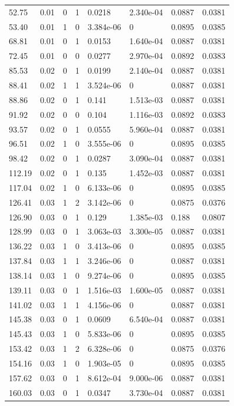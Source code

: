 \documentclass[preview]{standalone}
\begin{document}
{{\begin{tabular}{L{1.2cm}C{1.2cm} C{0.3cm}C{0.5cm} C{1.4cm}C{1.4cm} C{1.4cm}C{1.4cm}}
  52.75  &  0.01  & 0     &  1 &  0.0218  & 2.340e-04  & 0.0887 &  0.0381   \\ 
  53.40  &  0.01  & 1     &  0 &  3.384e-06  & 0  & 0.0895 &  0.0385   \\ 
  68.81  &  0.01  & 0     &  1 &  0.0153  & 1.640e-04  & 0.0887 &  0.0381   \\ 
  72.45  &  0.01  & 0     &  0 &  0.0277  & 2.970e-04  & 0.0892 &  0.0383   \\ 
  85.53  &  0.02  & 0     &  1 &  0.0199  & 2.140e-04  & 0.0887 &  0.0381   \\ 
  88.41  &  0.02  & 1     &  1 &  3.524e-06  & 0  & 0.0887 &  0.0381   \\ 
  88.86  &  0.02  & 0     &  1 &  0.141  & 1.513e-03  & 0.0887 &  0.0381   \\ 
  91.92  &  0.02  & 0     &  0 &  0.104  & 1.116e-03  & 0.0892 &  0.0383   \\ 
  93.57  &  0.02  & 0     &  1 &  0.0555  & 5.960e-04  & 0.0887 &  0.0381   \\ 
  96.51  &  0.02  & 1     &  0 &  3.555e-06  & 0  & 0.0895 &  0.0385   \\ 
  98.42  &  0.02  & 0     &  1 &  0.0287  & 3.090e-04  & 0.0887 &  0.0381   \\ 
  112.19  &  0.02  & 0     &  1 &  0.135  & 1.452e-03  & 0.0887 &  0.0381   \\ 
  117.04  &  0.02  & 1     &  0 &  6.133e-06  & 0  & 0.0895 &  0.0385   \\ 
  126.41  &  0.03  & 1     &  2 &  3.142e-06  & 0  & 0.0875 &  0.0376   \\ 
  126.90  &  0.03  & 0     &  1 &  0.129  & 1.385e-03  & 0.188 &  0.0807   \\ 
  128.99  &  0.03  & 0     &  1 &  3.063e-03  & 3.300e-05  & 0.0887 &  0.0381   \\ 
  136.22  &  0.03  & 1     &  0 &  3.413e-06  & 0  & 0.0895 &  0.0385   \\ 
  137.84  &  0.03  & 1     &  1 &  3.246e-06  & 0  & 0.0887 &  0.0381   \\ 
  138.14  &  0.03  & 1     &  0 &  9.274e-06  & 0  & 0.0895 &  0.0385   \\ 
  139.11  &  0.03  & 0     &  1 &  1.516e-03  & 1.600e-05  & 0.0887 &  0.0381   \\ 
  141.02  &  0.03  & 1     &  1 &  4.156e-06  & 0  & 0.0887 &  0.0381   \\ 
  145.38  &  0.03  & 0     &  1 &  0.0609  & 6.540e-04  & 0.0887 &  0.0381   \\ 
  145.43  &  0.03  & 1     &  0 &  5.833e-06  & 0  & 0.0895 &  0.0385   \\ 
  153.42  &  0.03  & 1     &  2 &  6.328e-06  & 0  & 0.0875 &  0.0376   \\ 
  154.16  &  0.03  & 1     &  0 &  1.903e-05  & 0  & 0.0895 &  0.0385   \\ 
  157.62  &  0.03  & 0     &  1 &  8.612e-04  & 9.000e-06  & 0.0887 &  0.0381   \\ 
  160.03  &  0.03  & 0     &  1 &  0.0347  & 3.730e-04  & 0.0887 &  0.0381   \\ 
\hline 
\end{tabular} 

}}
\end{document}
